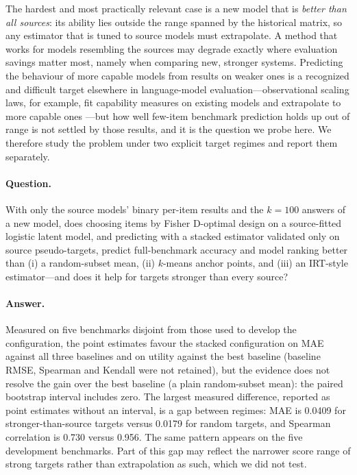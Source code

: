 \documentclass{article}
\begin{document}
The hardest and most practically relevant case is a new model that is \emph{better than all sources}: its ability lies outside the range spanned by the historical matrix, so any estimator that is tuned to source models must extrapolate. A method that works for models resembling the sources may degrade exactly where evaluation savings matter most, namely when comparing new, stronger systems. Predicting the behaviour of more capable models from results on weaker ones is a recognized and difficult target elsewhere in language-model evaluation---observational scaling laws, for example, fit capability measures on existing models and extrapolate to more capable ones \citep{Ruan2024ObservationalSL}---but how well few-item benchmark prediction holds up out of range is not settled by those results, and it is the question we probe here. We therefore study the problem under two explicit target regimes and report them separately.

\paragraph{Question.} With only the source models' binary per-item results and the $k{=}100$ answers of a new model, does choosing items by Fisher D-optimal design on a source-fitted logistic latent model, and predicting with a stacked estimator validated only on source pseudo-targets, predict full-benchmark accuracy and model ranking better than (i) a random-subset mean, (ii) $k$-means anchor points, and (iii) an IRT-style estimator---and does it help for targets stronger than every source?

\paragraph{Answer.} Measured on five benchmarks disjoint from those used to develop the configuration, the point estimates favour the stacked configuration on MAE against all three baselines and on utility against the best baseline (baseline RMSE, Spearman and Kendall were not retained), but the evidence does not resolve the gain over the best baseline (a plain random-subset mean): the paired bootstrap interval includes zero. The largest measured difference, reported as point estimates without an interval, is a gap between regimes: MAE is 0.0409 for stronger-than-source targets versus 0.0179 for random targets, and Spearman correlation is 0.730 versus 0.956. The same pattern appears on the five development benchmarks. Part of this gap may reflect the narrower score range of strong targets rather than extrapolation as such, which we did not test.
\end{document}
